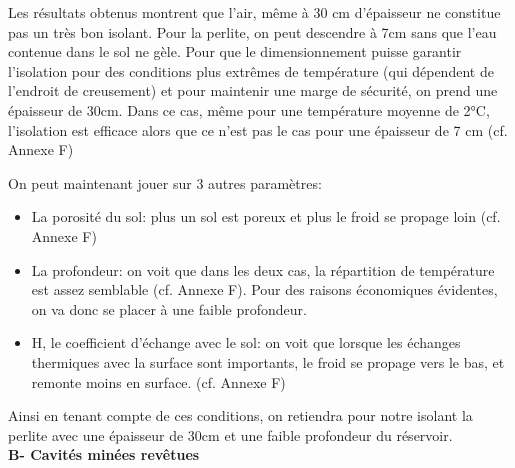 \documentclass[11pt,french,a4paper]{article}
\begin{document}
Les résultats obtenus montrent que l’air, même à 30 cm d’épaisseur ne constitue pas un très bon isolant. Pour la perlite, on peut descendre à 7cm sans que l’eau contenue dans le sol ne gèle. Pour que le dimensionnement puisse garantir l’isolation pour des conditions plus extrêmes de température (qui dépendent de l’endroit de creusement) et pour maintenir une marge de sécurité, on prend une épaisseur de 30cm.
Dans ce cas, même pour une température moyenne de 2°C, l’isolation est efficace alors que ce n’est pas le cas pour une épaisseur de 7 cm (cf. Annexe F) 

On peut maintenant jouer sur 3 autres paramètres: 
\begin{itemize}
\item La porosité du sol: plus un sol est poreux et plus le froid se propage loin (cf. Annexe F)
\item La profondeur: on voit que dans les deux cas, la répartition de température est assez semblable (cf. Annexe F). Pour des raisons économiques évidentes, on va donc se placer à une faible profondeur.
\item H, le coefficient d’échange avec le sol: on voit que lorsque les échanges thermiques avec la surface sont importants, le froid se propage vers le bas, et remonte moins en surface. (cf. Annexe F)
\end{itemize}

Ainsi en tenant compte de ces conditions, on retiendra pour notre isolant la perlite avec une épaisseur de 30cm et une faible profondeur du réservoir. \\

\textbf{B- Cavités minées revêtues}\\
\end{document}
